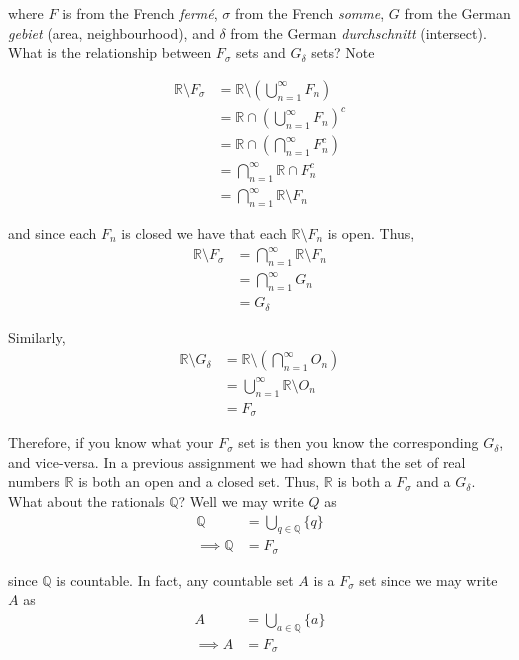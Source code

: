 \documentclass[12pt]{article}
\newlength\tindent
\renewcommand{\indent}{\hspace*{\tindent}}
\newcommand{\R}{\mathbb R}
\newcommand{\Q}{\mathbb Q}
\begin{document}
where  $F$ is from the French {\em ferm\'{e}}, $\sigma$ from the French {\em somme}, $G$ from the German {\em gebiet} (area, neighbourhood), and $\delta$ from the German {\em durchschnitt} (intersect). What is the relationship between $F_\sigma$ sets and $G_\delta$ sets? Note 

\begin{align*}
	\R \setminus F_\sigma &= \R \setminus \left( \bigcup^\infty_{n = 1} F_n \right) \\
	&= \R \cap \left( \bigcup^\infty_{n = 1} F_n \right)^c \\
	&= \R \cap \left( \bigcap^\infty_{n = 1} F_n^c \right) \\
	&= \bigcap^\infty_{n = 1} \R \cap F^c_n \\
	&= \bigcap^\infty_{n = 1} \R \setminus F_n
\end{align*}

and since each $F_n$ is closed we have that each $\R \setminus F_n$ is open. Thus,
\begin{align*}
	\R \setminus F_\sigma &= \bigcap^\infty_{n = 1} \R \setminus F_n \\
	&= \bigcap^\infty_{n = 1} G_n \\
	&= G_\delta
\end{align*}

Similarly,
\begin{align*}
	\R \setminus G_\delta &= \R \setminus \left( \bigcap^\infty_{n = 1} O_n \right) \\
	&= \bigcup^\infty_{n = 1} \R \setminus O_n \\
	&= F_\sigma
\end{align*}

\indent Therefore, if you know what your $F_\sigma$ set is then you know the corresponding $G_\delta$, and vice-versa. In a previous assignment we had shown that the set of real numbers $\R$ is both an open and a closed set. Thus, $\R$ is both a $F_\sigma$ and a $G_\delta$. \\

What about the rationals $\Q$? Well we may write $Q$ as
\begin{align*}
	\Q &= \bigcup_{q \in \Q} \{q\} \\
	\implies \Q &= F_\sigma 
\end{align*}

since $\Q$ is countable. In fact, any countable set $A$ is a $F_\sigma$ set since we may write $A$ as
\begin{align*}
	A &= \bigcup_{a \in \Q} \{a\} \\
	\implies A &= F_\sigma 
\end{align*}
\end{document}
